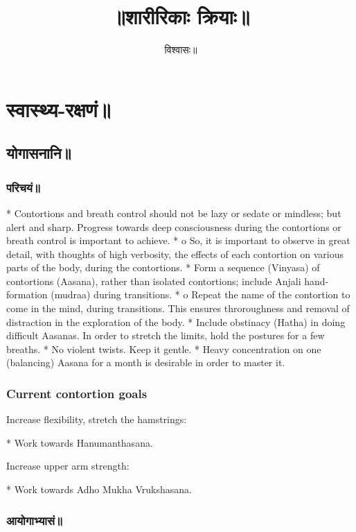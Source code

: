 \documentclass[oneside, article]{memoir}
\title{॥शारीरिकाः क्रियाः॥}
\author{विश्वासः॥}
\begin{document}
\maketitle

\tableofcontents

\part{स्वास्थ्य-रक्षणं॥}
\chapter{योगासनानि॥}
\section{परिचयं॥}
    * Contortions and breath control should not be lazy or sedate or mindless; but alert and sharp. Progress towards deep consciousness during the contortions or breath control is important to achieve.
    *
          o So, it is important to observe in great detail, with thoughts of high verbosity, the effects of each contortion on various parts of the body, during the contortions.
    * Form a sequence (Vinyasa) of contortions (Aasana), rather than isolated contortions; include Anjali hand-formation (mudraa) during transitions.
    *
          o Repeat the name of the contortion to come in the mind, during transitions. This ensures throroughness and removal of distraction in the exploration of the body.
    * Include obstinacy (Hatha) in doing difficult Aasanas. In order to stretch the limits, hold the postures for a few breaths.
    * No violent twists. Keep it gentle.
    * Heavy concentration on one (balancing) Aasana for a month is desirable in order to master it.

\section{Current contortion goals}

Increase flexibility, stretch the hamstrings:

    * Work towards Hanumanthasana.

Increase upper arm strength:

    * Work towards Adho Mukha Vrukshasana.

\section{आयोगाभ्यासं॥}
\end{document}
